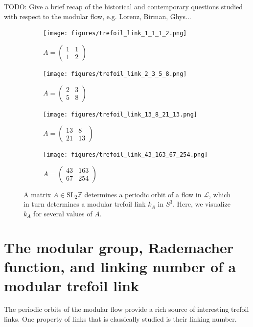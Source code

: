 \documentclass[12pt,twoside]{reedthesis}
\theoremstyle{definition}
\newcommand{\Z}{\mathbb{Z}}
\newcommand{\LS}{\mathcal{L}}
\newcommand{\SLZ}{\mathrm{SL}_2{\Z}}
\newcommand{\TODO}[1]{{\color{todopink}\textsf{TODO: #1}}}
\begin{document}
\TODO{Give a brief recap of the historical and contemporary questions studied with respect to the modular flow, e.g. Lorenz, Birman, Ghys...}

\begin{figure}[h!]
  \centering
  \begin{subfigure}[t]{0.48\textwidth}
    \centering
    \texttt{[image: figures/trefoil\_link\_1\_1\_1\_2.png]}
    \caption*{$A = \begin{pmatrix}1 & 1 \\ 1 & 2\end{pmatrix}$}
  \end{subfigure}
  \hfill
  \begin{subfigure}[t]{0.48\textwidth}
    \centering
    \texttt{[image: figures/trefoil\_link\_2\_3\_5\_8.png]}
    \caption*{$A = \begin{pmatrix}2 & 3 \\ 5 & 8\end{pmatrix}$}
  \end{subfigure}
  \begin{subfigure}[t]{0.48\textwidth}
    \centering
    \texttt{[image: figures/trefoil\_link\_13\_8\_21\_13.png]}
    \caption*{$A = \begin{pmatrix}13 & 8 \\ 21 & 13\end{pmatrix}$}
  \end{subfigure}
  \hfill
  \begin{subfigure}[t]{0.48\textwidth}
    \centering
    \texttt{[image: figures/trefoil\_link\_43\_163\_67\_254.png]}
    \caption*{$A = \begin{pmatrix}43 & 163\\ 67 & 254\end{pmatrix}$}
  \end{subfigure}
  \caption{A matrix $A \in \SLZ$ determines a periodic orbit of a flow in $\LS$, which in turn determines a modular trefoil link $k_A$ in $S^3$. Here, we visualize $k_A$ for several values of $A$.}
  \label{fig:trefoil_links}
\end{figure}

\section{The modular group, Rademacher function, and linking number of a modular trefoil link}

The periodic orbits of the modular flow provide a rich source of interesting trefoil links.
One property of links that is classically studied is their linking number.
\end{document}
